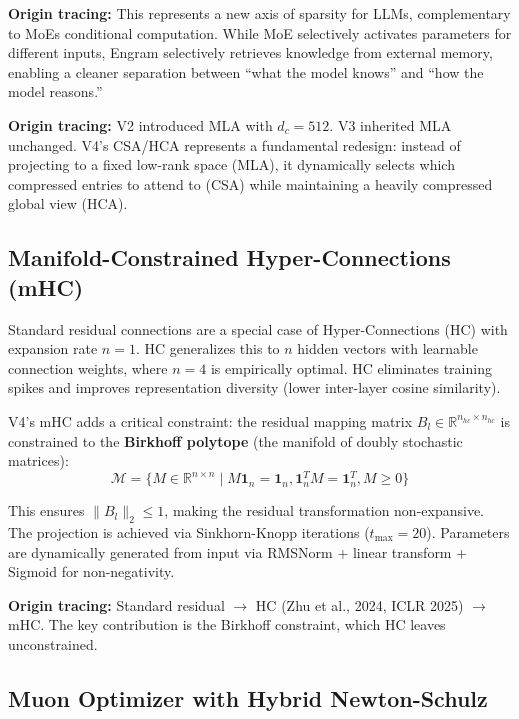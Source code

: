 \documentclass[11pt,a4paper]{article}
\begin{document}
\textbf{Origin tracing:} This represents a new axis of sparsity for LLMs, complementary to MoE{\textquotesingle}s conditional computation. While MoE selectively activates parameters for different inputs, Engram selectively retrieves knowledge from external memory, enabling a cleaner separation between {\textquotedblleft}what the model knows{\textquotedblright} and {\textquotedblleft}how the model reasons.{\textquotedblright}

\textbf{Origin tracing:} V2 introduced MLA with $d_c=512$. V3 inherited MLA unchanged. V4's CSA/HCA represents a fundamental redesign: instead of projecting to a fixed low-rank space (MLA), it dynamically selects which compressed entries to attend to (CSA) while maintaining a heavily compressed global view (HCA).

\subsection{Manifold-Constrained Hyper-Connections (mHC)}
\label{sec:mhc}

Standard residual connections are a special case of Hyper-Connections (HC) with expansion rate $n=1$. HC generalizes this to $n$ hidden vectors with learnable connection weights, where $n=4$ is empirically optimal. HC eliminates training spikes and improves representation diversity (lower inter-layer cosine similarity).

V4's mHC adds a critical constraint: the residual mapping matrix $B_l \in \mathbb{R}^{n_{hc} \times n_{hc}}$ is constrained to the \textbf{Birkhoff polytope} (the manifold of doubly stochastic matrices):
\begin{equation}
\mathcal{M} = \{M \in \mathbb{R}^{n \times n} \mid M\mathbf{1}_n = \mathbf{1}_n, \mathbf{1}_n^T M = \mathbf{1}_n^T, M \geq 0\}
\end{equation}

This ensures $\|B_l\|_2 \leq 1$, making the residual transformation non-expansive. The projection is achieved via Sinkhorn-Knopp iterations ($t_{\max}=20$). Parameters are dynamically generated from input via RMSNorm + linear transform + Sigmoid for non-negativity.

\textbf{Origin tracing:} Standard residual $\to$ HC (Zhu et al., 2024, ICLR 2025) $\to$ mHC. The key contribution is the Birkhoff constraint, which HC leaves unconstrained.

\subsection{Muon Optimizer with Hybrid Newton-Schulz}
\label{sec:muon}
\end{document}
